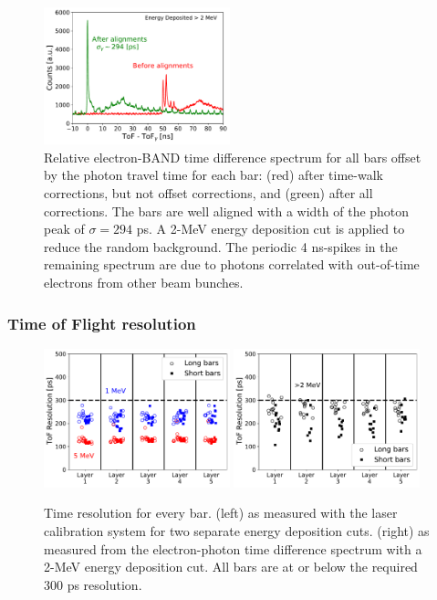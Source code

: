 \documentclass[3p,twocolumn]{elsarticle}
\begin{document}
\begin{figure}[tbh!]
	\centering
		\includegraphics[width=0.48\textwidth]{fig21-alignment.pdf}
                \caption{Relative electron-BAND time difference
                  spectrum for all bars offset by the photon travel
                  time for each bar: (red) after time-walk
                  corrections, but not offset corrections, and (green)
                  after all corrections. The bars are well
                  aligned with a width of the photon peak of
                  $\sigma=294$ \si{\pico\s}. A 2-\si{\mega\electronvolt} energy deposition cut is
                  applied to reduce the random background.  The
                  periodic 4 \si{\nano\s}-spikes in the remaining
                  spectrum are due to photons correlated with out-of-time
                  electrons from other beam bunches.}
	\label{fig:final_offset}
\end{figure}

\subsubsection{Time of Flight resolution}
\label{sec:tofresolution}
\begin{figure}[tbh!]
	\centering
			\includegraphics[width=0.48\textwidth]{fig22a-laserres.pdf}
		\includegraphics[width=0.48\textwidth]{fig22b-photonres.pdf}
	\caption{Time resolution for every bar. (left) as measured
          with the laser calibration system for two separate energy
          deposition cuts. (right) as measured
          from the electron-photon time difference spectrum with a
          2-\si{\mega\electronvolt} energy deposition cut. All bars
          are at or below the required 300 \si{\pico\s} resolution. }
	\label{fig:tof_resolution}
\end{figure}
\end{document}
